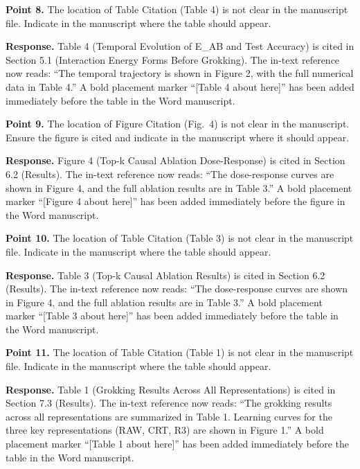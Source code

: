 \documentclass[11pt,a4paper]{article}
\begin{document}
\bigskip

\textbf{Point 8.} The location of Table Citation (Table 4) is not clear in the manuscript file. Indicate in the manuscript where the table should appear.

\textbf{Response.} Table 4 (Temporal Evolution of E\_AB and Test Accuracy) is cited in Section 5.1 (Interaction Energy Forms Before Grokking). The in-text reference now reads: ``The temporal trajectory is shown in Figure 2, with the full numerical data in Table 4.'' A bold placement marker ``[Table 4 about here]'' has been added immediately before the table in the Word manuscript.

\bigskip

\textbf{Point 9.} The location of Figure Citation (Fig.~4) is not clear in the manuscript. Ensure the figure is cited and indicate in the manuscript where it should appear.

\textbf{Response.} Figure 4 (Top-k Causal Ablation Dose-Response) is cited in Section 6.2 (Results). The in-text reference now reads: ``The dose-response curves are shown in Figure 4, and the full ablation results are in Table 3.'' A bold placement marker ``[Figure 4 about here]'' has been added immediately before the figure in the Word manuscript.

\bigskip

\textbf{Point 10.} The location of Table Citation (Table 3) is not clear in the manuscript file. Indicate in the manuscript where the table should appear.

\textbf{Response.} Table 3 (Top-k Causal Ablation Results) is cited in Section 6.2 (Results). The in-text reference now reads: ``The dose-response curves are shown in Figure 4, and the full ablation results are in Table 3.'' A bold placement marker ``[Table 3 about here]'' has been added immediately before the table in the Word manuscript.

\bigskip

\textbf{Point 11.} The location of Table Citation (Table 1) is not clear in the manuscript file. Indicate in the manuscript where the table should appear.

\textbf{Response.} Table 1 (Grokking Results Across All Representations) is cited in Section 7.3 (Results). The in-text reference now reads: ``The grokking results across all representations are summarized in Table 1. Learning curves for the three key representations (RAW, CRT, R3) are shown in Figure 1.'' A bold placement marker ``[Table 1 about here]'' has been added immediately before the table in the Word manuscript.
\end{document}
